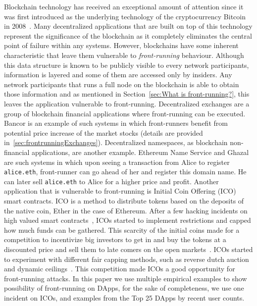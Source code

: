 Blockchain technology has received an exceptional amount of attention since it was first introduced as the underlying technology of the cryptocurrency Bitcoin in 2008~\cite{nakamoto2008bitcoin}. Many decentralized applications that are built on top of this technology represent the significance of the blockchain as it completely eliminates the central point of failure within any systems. However, blockchains have some inherent characteristic that leave them vulnerable to \emph{front-running} behaviour. Although this data structure is known to be publicly visible to every network participants, information is layered and some of them are accessed only by insiders. Any network participants that runs a full node on the blockchain is able to obtain those information and as mentioned in Section~\ref{sec:What is front-running?}, this leaves the application vulnerable to front-running. Decentralized exchanges are a group of blockchain financial applications where front-running can be executed. 
Bancor \cite{hertzog2017bancor} is an example of such systems in which front-runners benefit from potential price increase of the market stocks (details are provided in~\ref{sec:frontrunningExchanges}). Decentralized namespaces, as blockchain non-financial applications, are another example. Ethereum Name Service and Ghazal \cite{moosavighazal} are such systems in which upon seeing a transaction from Alice to register \texttt{alice.eth}, front-runner can go ahead of her and register this domain name. He can later sell \texttt{alice.eth} to Alice for a higher price and profit.
Another application that is vulnerable to front-running is Initial Coin Offering (ICO) smart contracts. ICO is a method to distribute tokens based on the deposits of the native coin, Ether in the case of Ethereum. After a few hacking incidents on high valued smart contracts~\cite{siegel2016daohack}, ICOs started to implement restrictions and capped how much funds can be gathered. This scarcity of the initial coins made for a competition to incentivize big investors to get in and buy the tokens at a discounted price and sell them to late comers on the open markets~\cite{zetzsche2018ico, li2018initial}. ICOs started to experiment with different fair capping methods, such as reverse dutch auction and dynamic ceilings~\cite{kaal2017initial}.  This competition made ICOs a good opportunity for front-running attacks.  In this paper we use multiple empirical examples to show possibility of front-running on DApps, for the sake of completeness, we use one incident on ICOs, and examples from the Top 25 DApps by recent user counts. %

